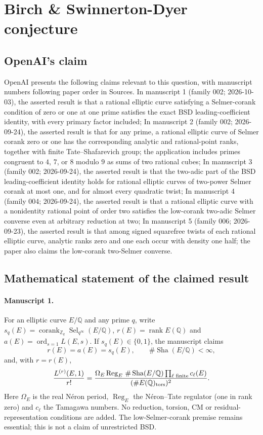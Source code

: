 \documentclass[11pt]{article}
\begin{document}
\section*{Birch \& Swinnerton-Dyer conjecture}

\subsection{OpenAI's claim}
OpenAI presents the following claims relevant to this question, with manuscript numbers following paper order in Sources. In manuscript 1 (family 002; 2026-10-03), the asserted result is that a rational elliptic curve satisfying a Selmer-corank condition of zero or one at one prime satisfies the exact BSD leading-coefficient identity, with every primary factor included; In manuscript 2 (family 002; 2026-09-24), the asserted result is that for any prime, a rational elliptic curve of Selmer corank zero or one has the corresponding analytic and rational-point ranks, together with finite Tate--Shafarevich group; the application includes primes congruent to $4$, $7$, or $8$ modulo $9$ as sums of two rational cubes; In manuscript 3 (family 002; 2026-09-24), the asserted result is that the two-adic part of the BSD leading-coefficient identity holds for rational elliptic curves of two-power Selmer corank at most one, and for almost every quadratic twist; In manuscript 4 (family 004; 2026-09-24), the asserted result is that a rational elliptic curve with a nonidentity rational point of order two satisfies the low-corank two-adic Selmer converse even at arbitrary reduction at two; In manuscript 5 (family 006; 2026-09-23), the asserted result is that among signed squarefree twists of each rational elliptic curve, analytic ranks zero and one each occur with density one half; the paper also claims the low-corank two-Selmer converse.

\subsection{Mathematical statement of the claimed result}
\paragraph{Manuscript 1.}
For an elliptic curve $E/\mathbb Q$ and any prime $q$, write $s_q(E)=\operatorname{corank}_{\mathbb Z_q}\operatorname{Sel}_{q^{\infty}}(E/\mathbb Q)$, $r(E)=\operatorname{rank}E(\mathbb Q)$ and $a(E)=\operatorname{ord}_{s=1}L(E,s)$. If $s_q(E)\in\{0,1\}$, the manuscript claims
\[
 r(E)=a(E)=s_q(E),\qquad\#\operatorname{Sha}(E/\mathbb Q)<\infty,
\]
and, with $r=r(E)$,
\[
 \frac{L^{(r)}(E,1)}{r!}
 =\frac{\Omega_E\operatorname{Reg}_E\,\#\operatorname{Sha}(E/\mathbb Q)\prod_{\ell\text{ finite}}c_{\ell}(E)}
 {(\#E(\mathbb Q)_{\rm tors})^2}.
\]
Here $\Omega_E$ is the real N\'eron period, $\operatorname{Reg}_E$ the N\'eron--Tate regulator (one in rank zero) and $c_{\ell}$ the Tamagawa numbers. No reduction, torsion, CM or residual-representation conditions are added. The low-Selmer-corank premise remains essential; this is not a claim of unrestricted BSD.
\end{document}
